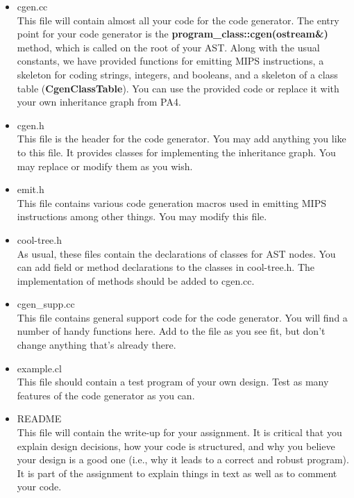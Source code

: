 \documentclass[11pt]{article}
\def\U#1{{\sf{}#1}}
\def\C#1{{\bf{}#1}}
\begin{document}
\begin{itemize}

\item \U{cgen.cc} \\
This file will contain almost all your code for the code generator.
The entry point for your code generator is the
\C{program\_class::cgen(ostream\&)} method, which is called on the
root of your AST.  Along with the usual constants, we have provided
functions for emitting MIPS instructions, a skeleton for coding
strings, integers, and booleans, and a skeleton of a class table
(\C{CgenClassTable}).  You can use the provided code or replace it
with your own inheritance graph from PA4.

\item \U{cgen.h} \\
This file is the header for the code generator.  You may add anything you
like to this file.  It provides classes for implementing the inheritance
graph.  You may replace or modify them as you wish.

\item \U{emit.h} \\
This file contains various code generation macros used in emitting MIPS
instructions among other things.  You may modify this file.

\item \U{cool-tree.h} \\
As usual, these files contain the declarations of classes for AST
nodes.  You can add field or method declarations to the classes in
\U{cool-tree.h}.  The implementation of methods should be added to
\U{cgen.cc}.

\item \U{cgen\_supp.cc} \\
This file contains general support code for the code generator.  You
will find a number of handy functions here.  Add to the file as you see
fit, but don't change anything that's already there.

\item \U{example.cl} \\
This file should contain a test program of your own design.  
Test as many features of the code generator as you can.

\item \U{README}\\
This file will contain the write-up for your assignment. 
It is critical that you explain design decisions, how your
code is structured, and why you believe your design is a good one
(i.e., why it leads to a correct and robust program).  It is part of
the assignment to explain things in text as well as to comment your
code. 

\end{itemize}
\end{document}
